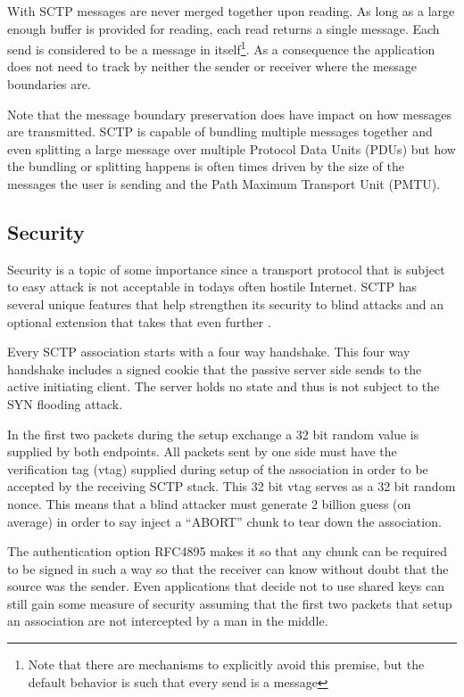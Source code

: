 \documentclass[conference]{IEEEtran}
\begin{document}
With SCTP messages are never merged together upon reading. As long
as a large enough buffer is provided for reading, each read returns a 
single message. Each send is considered to be a message in itself\footnote{Note that
there are mechanisms to explicitly avoid this premise, but the default behavior is such
that every send is a message}. As a consequence the application does not need to
track by neither the sender or receiver where the message boundaries are.

Note that the message boundary preservation does have impact on how
messages are transmitted. SCTP is capable of bundling multiple messages
together and even splitting a large message over multiple Protocol Data Units (PDUs)
but how the bundling or splitting happens is often times driven by the size of the 
messages the user is sending and the Path Maximum Transport Unit (PMTU).


\subsection{Security}
\label{secure}

Security is a topic of  some importance since a transport protocol that is subject
to easy attack is not acceptable in todays often hostile Internet. SCTP has several
unique features that help strengthen its security to blind attacks and an optional
extension that takes that even further \cite{rfc4895}.

Every SCTP association starts with a four way handshake. This four
way handshake includes a signed cookie that the passive server side
sends to the active initiating client. The server holds no state and thus
is not subject to the SYN flooding attack. 

In the first two packets during the setup exchange a 32 bit random
value is supplied by both endpoints. All packets sent by one side must
have the verification tag (vtag) supplied during setup of the association in
order to be accepted by the receiving SCTP stack. This 32 bit vtag serves
as a 32 bit random nonce. This means that a blind attacker must generate
2 billion guess (on average) in order to say inject a ``ABORT'' chunk to tear
down the association. 

The authentication option RFC4895\cite{rfc4895} makes it so that any chunk can
be required to be signed in such a way so that the receiver can know
without doubt that the source was the sender. Even applications that
decide not to use shared keys can still gain some measure of security assuming
that the first two packets that setup an association are not intercepted by a
man in the middle.
\end{document}

